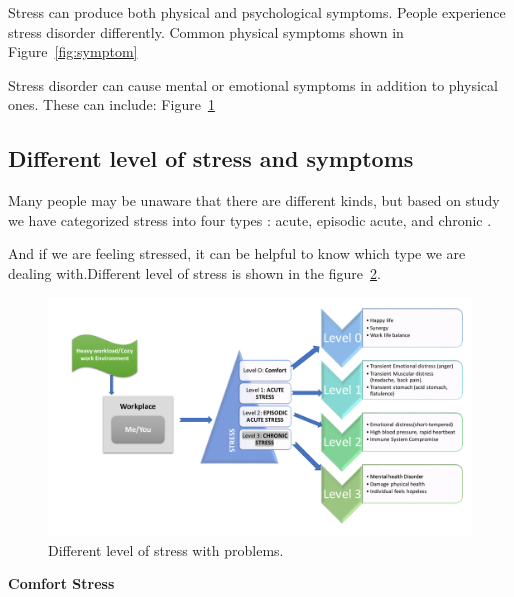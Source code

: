 Stress can produce both physical and psychological symptoms. People experience stress disorder differently. Common physical symptoms shown in Figure~\ref{fig:symptom} 

Stress disorder can cause mental or emotional symptoms in addition to physical ones. These can include: Figure~\ref{fig:mentalsymptom} 
\begin{figure}[ht!]
\centering
{}
  \label{fig:mentalsymptom}
\end{figure}

\subsection{Different level of stress and symptoms}
Many people may be unaware that there are different kinds, but based on study we have categorized stress into four types : acute, episodic acute, and chronic . 

And if we are feeling stressed, it can be helpful to know which type we are dealing with.Different level of stress is shown in the figure~\ref{fig:levelOfStress}.

\begin{figure}[ht!] %
  \centering
  \includegraphics[width=1.10\linewidth]{chap1/images/problem_goal.pdf}
  \caption[Different level of stress ]{Different level of stress with problems.}
  \label{fig:levelOfStress}
\end{figure}

\textbf{Comfort Stress}

